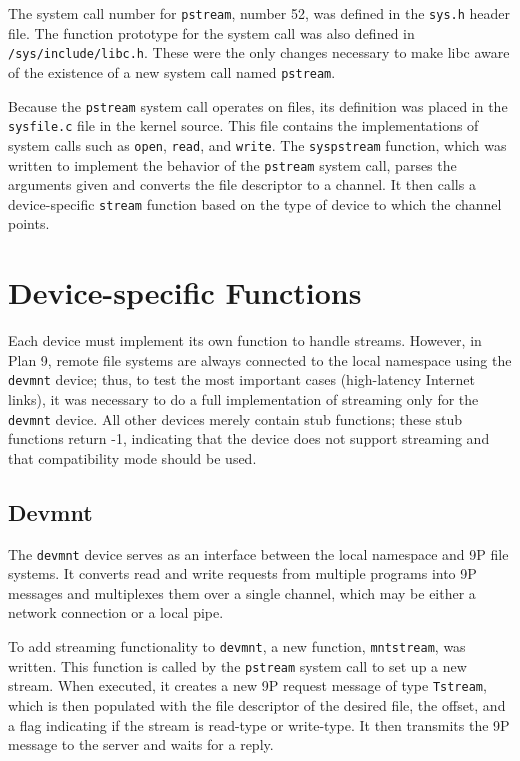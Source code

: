 \documentclass[11pt,american]{report}
\begin{document}
The system call number for {\tt pstream}, number 52, was defined in the {\tt sys.h} header file. The function prototype for the system call was also defined in {\tt /sys/include/libc.h}. These were the only changes necessary to make libc aware of the existence of a new system call named {\tt pstream}.

Because the {\tt pstream} system call operates on files, its definition was placed in the {\tt sysfile.c} file in the kernel source. This file contains the implementations of system calls such as {\tt open}, {\tt read}, and {\tt write}. The {\tt syspstream} function, which was written to implement the behavior of the {\tt pstream} system call, parses the arguments given and converts the file descriptor to a channel. It then calls a device-specific {\tt stream} function based on the type of device to which the channel points.

\section{Device-specific Functions}

Each device must implement its own function to handle streams. However, in Plan 9, remote file systems are always connected to the local namespace using the {\tt devmnt} device; thus, to test the most important cases (high-latency Internet links), it was necessary to do a full implementation of streaming only for the {\tt devmnt} device. All other devices merely contain stub functions; these stub functions return -1, indicating that the device does not support streaming and that compatibility mode should be used.

\subsection{Devmnt}

The {\tt devmnt} device serves as an interface between the local namespace and 9P file systems. It converts read and write requests from multiple programs into 9P messages and multiplexes them over a single channel, which may be either a network connection or a local pipe.

To add streaming functionality to {\tt devmnt}, a new function, {\tt mntstream}, was written. This function is called by the {\tt pstream} system call to set up a new stream. When executed, it creates a new 9P request message of type {\tt Tstream}, which is then populated with the file descriptor of the desired file, the offset, and a flag indicating if the stream is read-type or write-type. It then transmits the 9P message to the server and waits for a reply.
\end{document}
